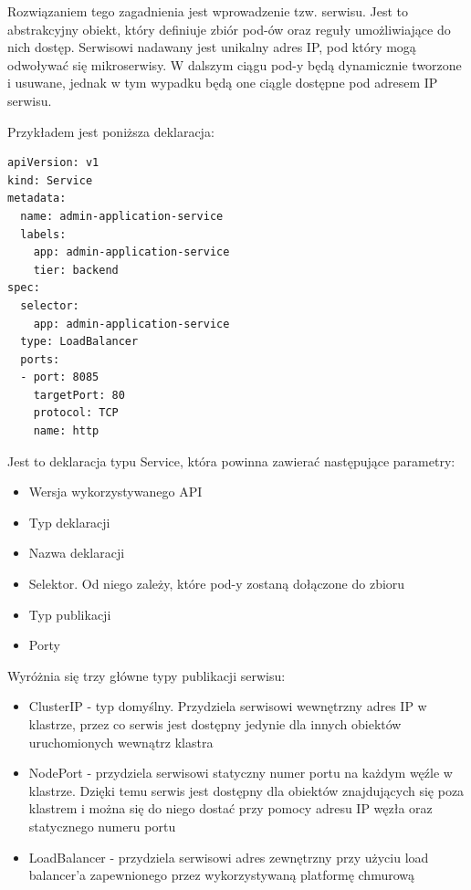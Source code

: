 \documentclass[11pt, a4]{article} %
\begin{document}
Rozwiązaniem tego zagadnienia jest wprowadzenie tzw. serwisu. Jest to abstrakcyjny 
obiekt, który definiuje zbiór pod-ów oraz reguły umożliwiające do nich dostęp. 
Serwisowi nadawany jest unikalny adres IP, pod który mogą odwoływać się mikroserwisy. 
W dalszym ciągu pod-y będą dynamicznie tworzone i usuwane, jednak w tym wypadku będą 
one ciągle dostępne pod adresem IP serwisu.

Przykładem jest poniższa deklaracja:

\begin{lstlisting}
apiVersion: v1
kind: Service
metadata:
  name: admin-application-service
  labels:
    app: admin-application-service
    tier: backend
spec:
  selector:
    app: admin-application-service
  type: LoadBalancer
  ports:
  - port: 8085
    targetPort: 80
    protocol: TCP
    name: http 
\end{lstlisting}

Jest to deklaracja typu Service, która powinna zawierać następujące parametry:

\begin{itemize} %
    \item Wersja wykorzystywanego API
    \item Typ deklaracji
    \item Nazwa deklaracji
    \item Selektor. Od niego zależy, które pod-y zostaną dołączone do zbioru
    \item Typ publikacji
    \item Porty
\end{itemize}

Wyróżnia się trzy główne typy publikacji serwisu:

\begin{itemize} %
    \item ClusterIP - typ domyślny. Przydziela serwisowi wewnętrzny adres IP 
    w klastrze, przez co serwis jest dostępny jedynie dla innych obiektów uruchomionych 
    wewnątrz klastra
    \item NodePort - przydziela serwisowi statyczny numer portu na każdym węźle 
    w klastrze. Dzięki temu serwis jest dostępny dla obiektów znajdujących się poza 
    klastrem i można się do niego dostać przy pomocy adresu IP węzła oraz statycznego 
    numeru portu
    \item LoadBalancer - przydziela serwisowi adres zewnętrzny przy użyciu load 
    balancer'a zapewnionego przez wykorzystywaną platformę chmurową
\end{itemize}
\end{document}
